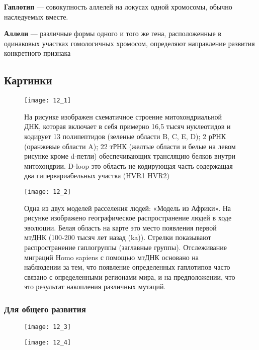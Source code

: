 \textbf{Гаплотип} — совокупность аллелей на локусах одной хромосомы, обычно наследуемых вместе.

\textbf{Аллели} — различные формы одного и того же гена, расположенные в одинаковых участках гомологичных хромосом, определяют направление развития конкретного признака

\subsection{Картинки}

\begin{figure}[H]
	\centering
	\texttt{[image: 12\_1]}
	\caption{На рисунке изображен схематичное строение митохондриальной ДНК, которая включает в себя примерно 16,5 тысяч нуклеотидов и кодирует 13 полипептидов (зеленые области B, C, E, D); 2 рРНК (оранжевые области A); 22 тРНК (желтые области и белые на левом рисунке кроме d-петли) обеспечивающих трансляцию белков внутри митохондрии. D-loop это область не кодирующая часть содержащая два гипервариабельных участка (HVR1 HVR2)}
\end{figure}

\begin{figure}[H]
	\centering
	\texttt{[image: 12\_2]}
	\caption{Одна из двух моделей расселения людей: «Модель из Африки». На рисунке изображено географическое распространение людей в ходе эволюции. Белая область на карте это место появления первой мтДНК (100-200 тысяч лет назад (ka)). Стрелки показывают распространение гаплогруппы (заглавные группы). Отслеживание миграций Homo sapiens с помощью мтДНК основано на наблюдении за тем, что появление определенных гаплотипов часто связано с определенными регионами мира, и на предположении, что это результат накопления различных мутаций.}
\end{figure}

\subsubsection{Для общего развития}

\begin{figure}[H]
	\centering
	\texttt{[image: 12\_3]}
\end{figure}

\begin{figure}[H]
	\centering
	\texttt{[image: 12\_4]}
\end{figure}
